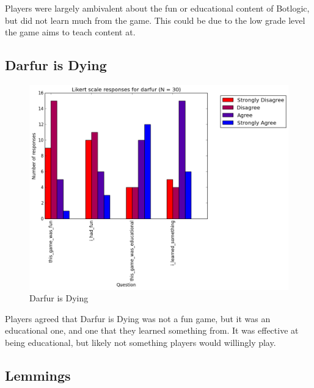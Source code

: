 				Players were largely ambivalent about the fun or educational content of Botlogic, but did not learn much from the game. This could be due to the low grade level the game aims to teach content at. 

			\subsection{Darfur is Dying}

				\begin{figure}[] 
				\centering 
				\includegraphics[width=\textwidth, height=.4\textheight, keepaspectratio=true]{darfur_likert.png} 
				\caption{Darfur is Dying}
				\end{figure}

				Players agreed that Darfur is Dying was not a fun game, but it was an educational one, and one that they learned something from. It was effective at being educational, but likely not something players would willingly play.

			\subsection{Lemmings}

